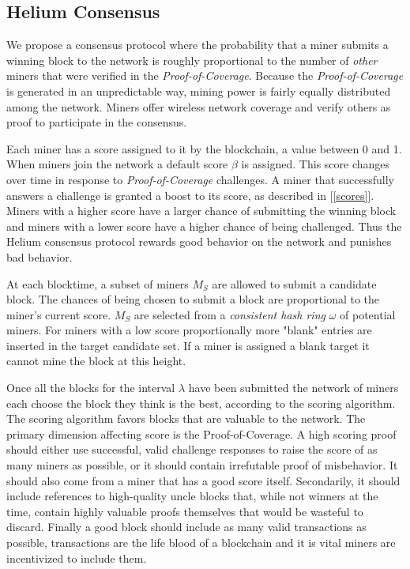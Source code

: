 \documentclass[letterpaper,11pt]{article}
\begin{document}
\subsection{Helium Consensus}

We propose a consensus protocol where the probability that a miner submits a winning block to the network is roughly proportional to the number of \emph{other} miners that were verified in the \emph{Proof-of-Coverage}. Because the \emph{Proof-of-Coverage} is generated in an unpredictable way, mining power is fairly equally distributed among the network. Miners offer wireless network coverage and verify others as proof to participate in the consensus.

Each miner has a score assigned to it by the blockchain, a value between 0 and 1. When miners join the network a default score $\beta$ is assigned. This score changes over time in response to \emph{Proof-of-Coverage} challenges. A miner that successfully answers a challenge is granted a boost to its score, as described in [\ref{scores}]. Miners with a higher score have a larger chance of submitting the winning block and miners with a lower score have a higher chance of being challenged. Thus the Helium consensus protocol rewards good behavior on the network and punishes bad behavior.

At each blocktime, a subset of miners $M_S$ are allowed to submit a candidate block. The chances of being chosen to submit a block are proportional to the miner's current score. $M_S$ are selected from a \emph{consistent hash ring} $\omega$ of potential miners. For miners with a low score proportionally more "blank" entries are inserted in the target candidate set. If a miner is assigned a blank target it cannot mine the block at this height. 

Once all the blocks for the interval $\lambda$ have been submitted the network of miners each choose the block they think is the best, according to the scoring algorithm. The scoring algorithm favors blocks that are valuable to the network. The primary dimension affecting score is the Proof-of-Coverage. A high scoring proof should either use successful, valid challenge responses to raise the score of as many miners as possible, or it should contain irrefutable proof of misbehavior. It should also come from a miner that has a good score itself. Secondarily, it should include references to high-quality uncle blocks that, while not winners at the time, contain highly valuable proofs themselves that would be wasteful to discard. Finally a good block should include as many valid transactions as possible, transactions are the life blood of a blockchain and it is vital miners are incentivized to include them.
\end{document}

